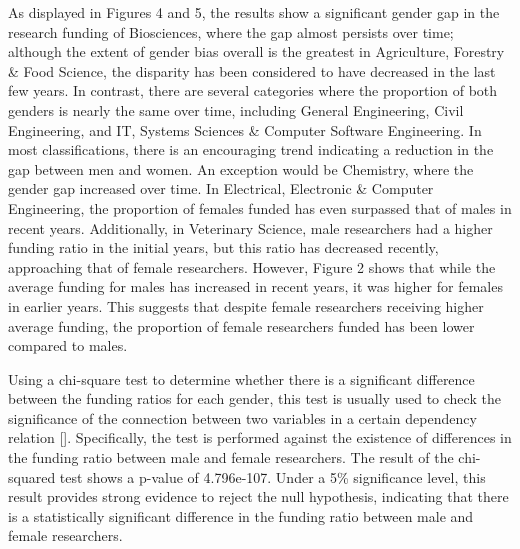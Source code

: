 \noindent As displayed in Figures 4 and 5, the results show a significant gender gap in the research funding of Biosciences, where the gap almost persists over time; although the extent of gender bias overall is the greatest in Agriculture, Forestry \& Food Science, the disparity has been considered to have decreased in the last few years. In contrast, there are several categories where the proportion of both genders is nearly the same over time, including General Engineering, Civil Engineering, and IT, Systems Sciences \& Computer Software Engineering. In most classifications, there is an encouraging trend indicating a reduction in the gap between men and women. An exception would be Chemistry, where the gender gap increased over time. In Electrical, Electronic \& Computer Engineering, the proportion of females funded has even surpassed that of males in recent years. Additionally, in Veterinary Science, male researchers had a higher funding ratio in the initial years, but this ratio has decreased recently, approaching that of female researchers. However, Figure 2 shows that while the average funding for males has increased in recent years, it was higher for females in earlier years. This suggests that despite female researchers receiving higher average funding, the proportion of female researchers funded has been lower compared to males.

Using a chi-square test to determine whether there is a significant difference between the funding ratios for each gender, this test is usually used to check the significance of the connection between two variables in a certain dependency relation [\cite{dura2017application}]. Specifically, the test is performed against the existence of differences in the funding ratio between male and female researchers. The result of the chi-squared test shows a p-value of 4.796e-107. Under a 5\% significance level, this result provides strong evidence to reject the null hypothesis, indicating that there is a statistically significant difference in the funding ratio between male and female researchers.

\pagebreak